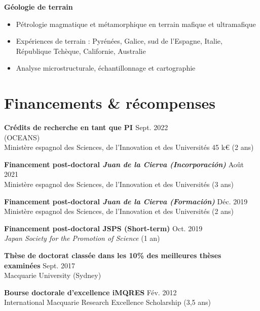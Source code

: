 \documentclass[a4paper,11pt]{article}
\begin{document}
    \textbf{Géologie de terrain}
    \begin{itemize}[itemsep=0pt,parsep=2pt]
        \item Pétrologie magmatique et métamorphique en terrain mafique et ultramafique
        \item Expériences de terrain : Pyrénées, Galice, sud de l'Espagne, Italie, République Tchèque, Californie, Australie
        \item Analyse microstructurale, échantillonnage et cartographie
    \end{itemize}

\section{Financements \& récompenses}

    \textbf{Crédits de recherche en tant que PI \textit{}}
    \hfill {Sept. 2022}\\
     (OCEANS)\\
    Ministère espagnol des Sciences, de l'Innovation et des Universités 45 k€ (2 ans)
    
    \textbf{Financement post-doctoral \textit{Juan de la Cierva (Incorporación)}}
    \hfill {Août 2021}\\
    Ministère espagnol des Sciences, de l'Innovation et des Universités (3 ans)
    
    \textbf{Financement post-doctoral \textit{Juan de la Cierva (Formación)}}
    \hfill {Déc. 2019}\\
    Ministère espagnol des Sciences, de l'Innovation et des Universités (2 ans)
    
    \textbf{Financement post-doctoral JSPS (Short-term)}
    \hfill {Oct. 2019}\\
    \textit{Japan Society for the Promotion of Science} (1 an)
    
    \textbf{Thèse de doctorat classée dans les 10\% des meilleures thèses examinées}
    \hfill {Sept. 2017}\\
    Macquarie University (Sydney)
    
    \textbf{Bourse doctorale d’excellence iMQRES}
    \hfill {Fév. 2012}\\
    International Macquarie Research Excellence Scholarship (3,5 ans)
\end{document}
